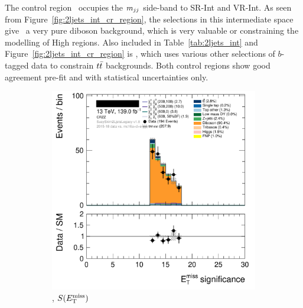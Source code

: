 The control region \crvz\ occupies the $m_{jj}$ side-band to
SR-Int and VR-Int.
As seen from Figure~\ref{fig:2ljets_int_cr_region}, the selections in this
intermediate space give \crvz\ a very pure diboson background, which is very
valuable or constraining the modelling of High regions.
Also included in Table~\ref{tab:2ljets_int} and
Figure~\ref{fig:2ljets_int_cr_region} is \crtt, which uses various other
selections of $b$-tagged data to constrain $t\bar t$ backgrounds.
Both control regions show good agreement pre-fit and with statistical uncertainties
only.
\begin{figure}[tp]
\centering
\begin{subfigure}{0.48\textwidth}
\centering
\includegraphics[width=\textwidth]{figures/2ljets_def_met_Sign_CRZZ.png}
\caption{\crvz, $S(E_\mathrm{T}^\mathrm{miss})$}
\end{subfigure}
\hfill
\begin{subfigure}{0.48\textwidth}
\centering

\end{subfigure}
\end{figure}
